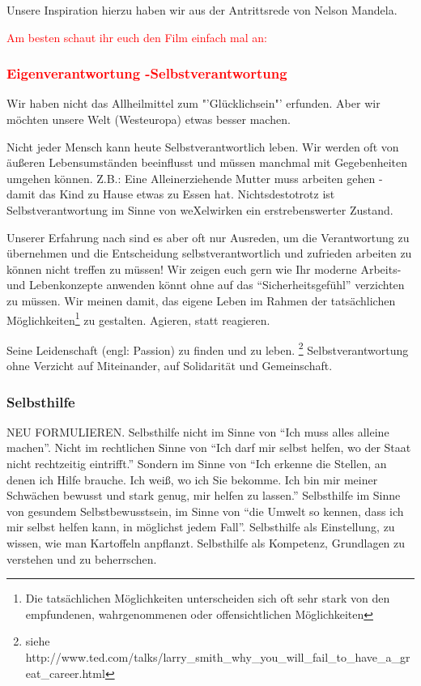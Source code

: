 Unsere Inspiration hierzu haben wir aus der Antrittsrede von Nelson Mandela.
{\textcolor{red} {Am besten schaut ihr euch den Film einfach mal an:}



      \subsubsection {\textcolor{red}{Eigenverantwortung -Selbstverantwortung}}
Wir haben nicht das Allheilmittel zum "'Glücklichsein"' erfunden. Aber wir möchten unsere Welt (Westeuropa) etwas besser machen.

Nicht jeder Mensch kann heute Selbstverantwortlich leben. Wir werden oft von äußeren Lebensumständen beeinflusst und müssen manchmal mit Gegebenheiten umgehen können. Z.B.: Eine Alleinerziehende Mutter muss arbeiten gehen - damit das Kind zu Hause etwas zu Essen hat. 
%
Nichtsdestotrotz ist Selbstverantwortung im Sinne von weXelwirken ein erstrebenswerter Zustand.


Unserer Erfahrung nach sind es aber oft nur Ausreden, um die Verantwortung zu übernehmen und die Entscheidung selbstverantwortlich und zufrieden arbeiten zu können nicht treffen zu müssen! Wir zeigen euch gern wie Ihr moderne Arbeits- und Lebenkonzepte anwenden könnt ohne auf das "`Sicherheitsgefühl"' verzichten zu müssen.
%
Wir meinen damit, das eigene Leben im Rahmen der tatsächlichen Möglichkeiten\footnote{Die tatsächlichen Möglichkeiten unterscheiden sich oft sehr stark von den empfundenen, wahrgenommenen oder offensichtlichen Möglichkeiten} zu gestalten.
%
Agieren, statt reagieren.


%
Seine Leidenschaft (engl: Passion) zu finden und zu leben. \footnote{siehe http://www.ted.com/talks/larry\_smith\_why\_you\_will\_fail\_to\_have\_a\_great\_career.html} 
%
Selbstverantwortung ohne Verzicht auf Miteinander, auf Solidarität und Gemeinschaft.
%

      \subsubsection{Selbsthilfe}
NEU FORMULIEREN. Selbsthilfe nicht im Sinne von "`Ich muss alles alleine machen"'.
%
Nicht im rechtlichen Sinne von "`Ich darf mir selbst helfen, wo der Staat nicht rechtzeitig eintrifft."'
%
Sondern im Sinne von "`Ich erkenne die Stellen, an denen ich Hilfe brauche.
%
Ich weiß, wo ich Sie bekomme.
%
Ich bin mir meiner Schwächen bewusst und stark genug, mir helfen zu lassen."'
%
Selbsthilfe im Sinne von gesundem Selbstbewusstsein, im Sinne von "`die Umwelt so kennen, dass ich mir selbst helfen kann, in möglichst jedem Fall"'.
%
Selbsthilfe als Einstellung, zu wissen, wie man Kartoffeln anpflanzt.
%
Selbsthilfe als Kompetenz, Grundlagen zu verstehen und zu beherrschen.
}
